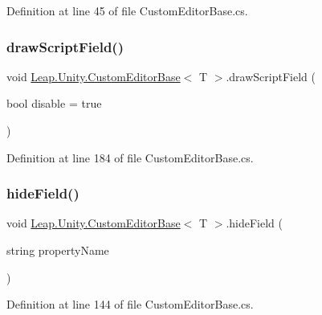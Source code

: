 Definition at line 45 of file Custom\+Editor\+Base.\+cs.

\mbox{\label{class_leap_1_1_unity_1_1_custom_editor_base_a7f6ef123a9be58a8891f68fdc4657d64}} 
\subsubsection{\texorpdfstring{drawScriptField()}{drawScriptField()}}
{\footnotesize\ttfamily void \mbox{\hyperlink{class_leap_1_1_unity_1_1_custom_editor_base}{Leap.\+Unity.\+Custom\+Editor\+Base}}$<$ T $>$.draw\+Script\+Field (\begin{DoxyParamCaption}\item[{bool}]{disable = {\ttfamily true} }\end{DoxyParamCaption})\hspace{0.3cm}{\ttfamily [protected]}}



Definition at line 184 of file Custom\+Editor\+Base.\+cs.

\mbox{\label{class_leap_1_1_unity_1_1_custom_editor_base_a4d6cf21850698537d7bf81aa27acc6c9}} 
\subsubsection{\texorpdfstring{hideField()}{hideField()}}
{\footnotesize\ttfamily void \mbox{\hyperlink{class_leap_1_1_unity_1_1_custom_editor_base}{Leap.\+Unity.\+Custom\+Editor\+Base}}$<$ T $>$.hide\+Field (\begin{DoxyParamCaption}\item[{string}]{property\+Name }\end{DoxyParamCaption})\hspace{0.3cm}{\ttfamily [protected]}}



Definition at line 144 of file Custom\+Editor\+Base.\+cs.


